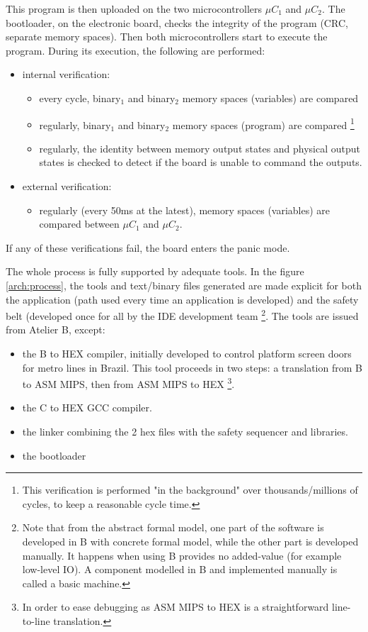 This program is then uploaded on the two microcontrollers $\mu C_1$ and $\mu C_2$. The bootloader, on the electronic board, checks the integrity of the program (CRC, separate memory spaces). Then both microcontrollers start to execute the program. During its execution, the following are performed:
\begin{itemize}
    \item internal verification:
\begin{itemize}
    \item every cycle, binary$_1$ and binary$_2$ memory spaces (variables) are compared
    \item regularly, binary$_1$ and binary$_2$ memory spaces (program) are compared \footnote{This verification is performed "in the background" over thousands/millions of cycles, to keep a reasonable cycle time.}
    \item regularly, the identity between memory output states and physical output states is checked to detect if the board is unable to command the outputs.
\end{itemize} 
\item external verification:
\begin{itemize}
    \item regularly (every 50ms at the latest), memory spaces (variables) are compared between $\mu C_1$ and $\mu C_2$. 
\end{itemize} 
\end{itemize} 
If any of these verifications fail, the board enters the panic mode.

The whole process is fully supported by adequate tools. In the figure \ref{arch:process}, the tools and text/binary files generated are made explicit for both the application (path used every time an application is developed) and the safety belt (developed once for all by the IDE development team \footnote{Note that from the abstract formal model, one part of the software is developed in B with concrete formal model, while the other part is developed manually. It happens when using B provides no added-value (for example low-level IO). A component modelled in B and implemented manually is called a basic machine.}. The tools are issued from Atelier B, except:
\begin{itemize}
    \item the B to HEX compiler, initially developed to control platform screen doors for metro lines in Brazil. This tool proceeds in two steps: a translation from B to ASM MIPS, then from ASM MIPS to HEX \footnote{In order to ease debugging as ASM MIPS to HEX is a straightforward line-to-line translation.}.
    \item the C to HEX GCC compiler.
    \item the linker combining the 2 hex files with the safety sequencer and libraries.
    \item the bootloader\\
\end{itemize}



